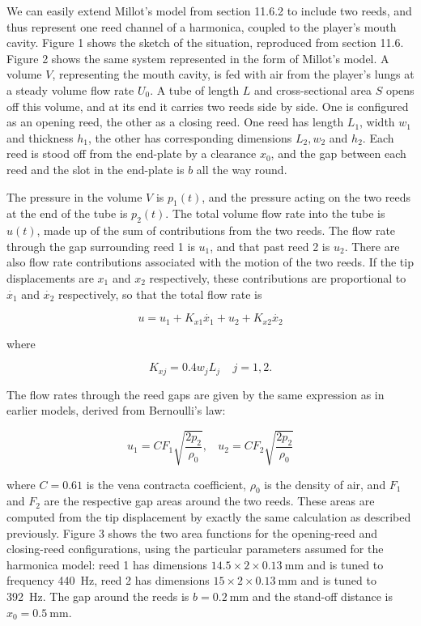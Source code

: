   We can easily extend Millot's model from section 11.6.2 to include two reeds, 
  and thus represent one reed channel of a harmonica, coupled to the player's 
  mouth cavity. Figure 1 shows the sketch of the situation, reproduced from 
  section 11.6. Figure 2 shows the same system represented in the form of 
  Millot's model. A volume $V$, representing the mouth cavity, is fed with air 
  from the player's lungs at a steady volume flow rate $U_0$. A tube of length 
  $L$ and cross-sectional area $S$ opens off this volume, and at its end it 
  carries two reeds side by side. One is configured as an opening reed, the 
  other as a closing reed. One reed has length $L_1$, width $w_1$ and thickness 
  $h_1$, the other has corresponding dimensions $L_2, w_2$ and $h_2$. Each reed 
  is stood off from the end-plate by a clearance $x_0$, and the gap between 
  each reed and the slot in the end-plate is $b$ all the way round. 

  The pressure in the volume $V$ is $p_1(t)$, and the pressure acting on the 
  two reeds at the end of the tube is $p_2(t)$. The total volume flow rate into 
  the tube is $u(t)$, made up of the sum of contributions from the two reeds. 
  The flow rate through the gap surrounding reed 1 is $u_1$, and that past reed 
  2 is $u_2$. There are also flow rate contributions associated with the motion 
  of the two reeds. If the tip displacements are $x_1$ and $x_2$ respectively, 
  these contributions are proportional to $\dot{x_1}$ and $\dot{x_2}$ 
  respectively, so that the total flow rate is 

  $$u=u_1+K_{x1} \dot{x_1} + u_2 +K_{x2} \dot{x_2} \tag{1}$$ 

  where 

  $$K_{xj}=0.4 w_j L_j \mathrm{~~~~~} j=1,2. \tag{2}$$ 

  The flow rates through the reed gaps are given by the same expression as in 
  earlier models, derived from Bernoulli's law: 

  $$u_1=CF_1 \sqrt{\dfrac{2p_2}{\rho_0}}, \mathrm{~~~~}u_2=CF_2 
  \sqrt{\dfrac{2p_2}{\rho_0}} \tag{3}$$ 

  where $C=0.61$ is the vena contracta coefficient, $\rho_0$ is the density of 
  air, and $F_1$ and $F_2$ are the respective gap areas around the two reeds. 
  These areas are computed from the tip displacement by exactly the same 
  calculation as described previously. Figure 3 shows the two area functions 
  for the opening-reed and closing-reed configurations, using the particular 
  parameters assumed for the harmonica model: reed 1 has dimensions $14.5 
  \times 2 \times 0.13 \mathrm{~mm}$ and is tuned to frequency 440~Hz, reed 2 
  has dimensions $15 \times 2 \times 0.13 \mathrm{~mm}$ and is tuned to 392~Hz. 
  The gap around the reeds is $b=0.2 \mathrm{~mm}$ and the stand-off distance 
  is $x_0=0.5 \mathrm{~mm}$. 

